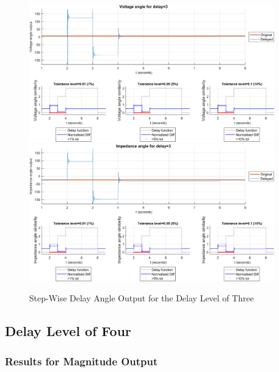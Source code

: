\begin{figure}
    \caption{Step-Wise Delay Angle Output for the Delay Level of Three}
    \includegraphics[width=0.95\textwidth]{PMUsim-figures/DelayOf_3/Step_vAngle.png}    
    \includegraphics[width=0.95\textwidth]{PMUsim-figures/DelayOf_3/Step_iAngle.png}    
    \label{fig:PMUsimStep_Three_Angle}
        \begin{small}
     \end{small}
\end{figure}
\newpage \subsection{Delay Level of Four}
\subsubsection{Results for Magnitude Output}

